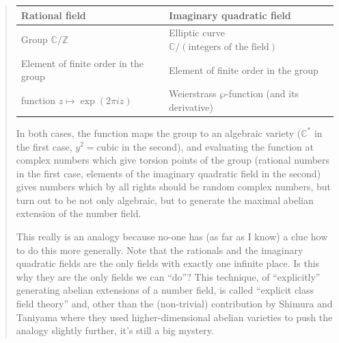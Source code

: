 \documentclass{article}
\begin{document}
\begin{quote}
\begin{longtable}[]{@{}ll@{}}
\toprule
\begin{minipage}[b]{0.34\columnwidth}\raggedright
Rational field\strut
\end{minipage} & \begin{minipage}[b]{0.60\columnwidth}\raggedright
Imaginary quadratic field\strut
\end{minipage}\tabularnewline
\midrule
\endhead
\begin{minipage}[t]{0.34\columnwidth}\raggedright
Group \(\mathbb{C}/\mathbb{Z}\)\strut
\end{minipage} & \begin{minipage}[t]{0.60\columnwidth}\raggedright
Elliptic curve \(\mathbb{C}/(\text{integers of the field})\)\strut
\end{minipage}\tabularnewline
\begin{minipage}[t]{0.34\columnwidth}\raggedright
Element of finite order in the group\strut
\end{minipage} & \begin{minipage}[t]{0.60\columnwidth}\raggedright
Element of finite order in the group\strut
\end{minipage}\tabularnewline
\begin{minipage}[t]{0.34\columnwidth}\raggedright
function \(z\mapsto\exp(2\pi iz)\)\strut
\end{minipage} & \begin{minipage}[t]{0.60\columnwidth}\raggedright
Weierstrass \(\wp\)-function (and its derivative)\strut
\end{minipage}\tabularnewline
\bottomrule
\end{longtable}

In both cases, the function maps the group to an algebraic variety
(\(\mathbb{C}^*\) in the first case, \(y^2=\text{cubic}\) in the
second), and evaluating the function at complex numbers which give
torsion points of the group (rational numbers in the first case,
elements of the imaginary quadratic field in the second) gives numbers
which by all rights should be random complex numbers, but turn out to be
not only algebraic, but to generate the maximal abelian extension of the
number field.

This really is an analogy because no-one has (as far as I know) a clue
how to do this more generally. Note that the rationals and the imaginary
quadratic fields are the only fields with exactly one infinite place. Is
this why they are the only fields we can ``do''? This technique, of
``explicitly'' generating abelian extensions of a number field, is
called ``explicit class field theory'' and, other than the (non-trivial)
contribution by Shimura and Taniyama where they used higher-dimensional
abelian varieties to push the analogy slightly further, it's still a big
mystery.


\end{quote}
\end{document}
